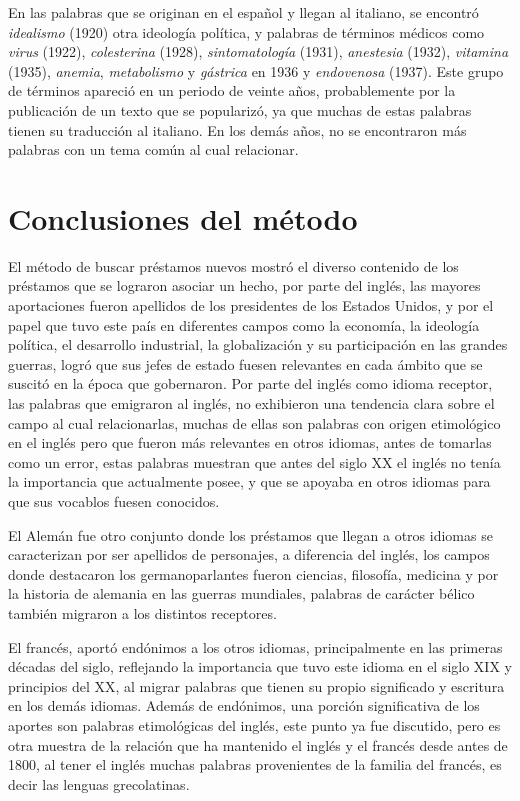 En las palabras que se originan en el español y llegan al italiano, se encontró \textit{idealismo} (1920) otra ideología política,  y palabras de términos médicos como \textit{virus} (1922), \textit{colesterina} (1928),  \textit{sintomatología} (1931), \textit{anestesia} (1932), \textit{vitamina} (1935), \textit{anemia}, \textit{metabolismo} y \textit{gástrica} en 1936  y \textit{endovenosa} (1937).  Este grupo de términos apareció en un periodo de veinte años, probablemente por la publicación de un texto que se popularizó, ya que muchas de estas palabras tienen su traducción al italiano. En los demás años, no se encontraron más palabras con un tema común al cual relacionar. 

\hfill\break
\hfill\break
\hfill\break
\section{Conclusiones del método}

El método de buscar préstamos nuevos mostró el diverso contenido de los préstamos que se lograron asociar un hecho,  por parte del inglés, las mayores aportaciones fueron apellidos de los presidentes de los Estados Unidos, y por el papel que tuvo este país en diferentes campos como la economía, la ideología política, el desarrollo industrial, la globalización y su participación en las grandes guerras, logró que sus jefes de estado fuesen relevantes en cada ámbito que se suscitó en la época que gobernaron.  Por parte del inglés como idioma receptor,  las palabras que emigraron al inglés, no exhibieron una tendencia clara sobre el campo al cual relacionarlas,  muchas de ellas son palabras con origen etimológico en el inglés pero que fueron más relevantes  en otros idiomas, antes de tomarlas como un error, estas palabras muestran que antes del siglo XX el inglés no tenía la importancia que actualmente posee, y que se apoyaba en otros idiomas para que sus vocablos fuesen conocidos. 

El Alemán fue otro conjunto donde los préstamos que llegan a otros idiomas se caracterizan por ser apellidos de personajes, a diferencia del inglés, los campos donde destacaron los germanoparlantes fueron ciencias, filosofía, medicina y  por la historia de alemania en las guerras mundiales,  palabras de carácter bélico también migraron a los distintos receptores.

El francés, aportó endónimos a los otros idiomas, principalmente en las primeras décadas del siglo, reflejando la importancia que tuvo este idioma en el siglo XIX y principios del XX, al migrar palabras que tienen su propio significado y escritura en los demás idiomas.  Además de endónimos,  una porción significativa de los aportes son palabras etimológicas del inglés,  este punto ya fue discutido, pero es otra muestra de la relación que ha mantenido el inglés y el francés  desde antes de 1800, al tener el inglés muchas palabras provenientes de la familia del francés, es decir las lenguas grecolatinas. 

